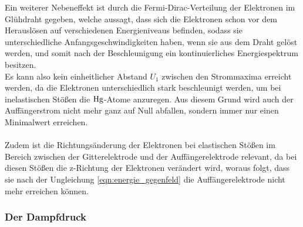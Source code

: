     Ein weiterer Nebeneffekt ist durch die Fermi-Dirac-Verteilung der Elektronen
    im Glühdraht gegeben,
    welche aussagt,
    dass sich die Elektronen schon vor dem Herauslösen auf verschiedenen Energieniveaus befinden,
    sodass sie unterschiedliche Anfangsgeschwindigkeiten haben,
    wenn sie aus dem Draht gelöst werden,
    und somit nach der Beschleunigung ein kontinuierliches Energiespektrum besitzen.\\
    Es kann also kein einheitlicher Abstand $U_1$ zwischen den Strommaxima erreicht werden,
    da die Elektronen unterschiedlich stark beschleunigt werden,
    um bei inelastischen Stößen die $\ce{Hg}$-Atome anzuregen.
    Aus diesem Grund wird auch der Auffängerstrom nicht mehr ganz auf Null abfallen,
    sondern immer nur einen Minimalwert erreichen.\\
    \\
    Zudem ist die Richtungsänderung der Elektronen bei elastischen Stößen im Bereich zwischen der Gitterelektrode und der Auffängerelektrode relevant,
    da bei diesen Stößen die z-Richtung der Elektronen verändert wird,
    woraus folgt,
    dass sie nach der Ungleichung \ref{eqn:energie_gegenfeld} die Auffängerelektrode nicht mehr erreichen können.

\subsubsection{Der Dampfdruck}
\label{sec:dampfdruck}

